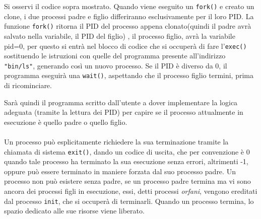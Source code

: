\documentclass[12pt, letterpaper]{article}
\newcommand{\code}[1]{\colorbox{light-gray}{\texttt{#1}}}
\begin{document}
Si osservi il codice sopra mostrato. Quando viene eseguito un \code{fork()} e creato un clone, i due processi 
padre e figlio differiranno esclusivamente per il loro PID. La funzione \code{fork()} ritorna il PID del 
processo appena clonato(quindi il padre avrà salvato nella variabile, il PID del figlio)
, il processo figlio, avrà la variabile pid=0, per questo si entrà nel blocco 
di codice che si occuperà di fare l'\code{exec()} sostituendo le istruzioni con quelle del 
programma presente all'indirizzo \code{"bin/ls"}, generando così un nuovo processo. Se il PID è diverso da 0, 
il programma eseguirà una \code{wait()}, aspettando che il processo figlio termini, prima di ricominciare.
\begin{figure}[h]
\end{figure}
Sarà quindi il programma scritto dall'utente a dover implementare la logica adeguata (tramite la 
lettura dei PID) per capire se il processo attualmente in esecuzione è quello padre o quello figlio.
\\\hphantom{}\\ 
Un processo può esplicitamente richiedere la sua terminazione tramite la chiamata di 
sistema \code{exit()}, dando un codice di uscita, che per convenzione è 0 quando tale processo 
ha terminato la sua esecuzione senza errori, altrimenti -1, oppure può essere terminato in maniere 
forzata dal suo processo padre. Un processo non può esistere senza padre,
se un processo padre termina ma vi sono ancora dei processi figli in esecuzione, essi, detti 
processi \textit{orfani}, vengono ereditati dal processo \code{init}, che si occuperà di terminarli.
Quando un processo termina, lo spazio dedicato alle sue risorse viene liberato.
\end{document}
